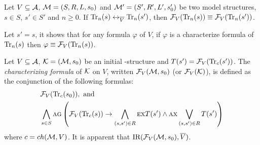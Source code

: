 \documentclass{article}
\begin{document}
\begin{lemma}\label{lem:Vb:TrFormula:Equ}
Let $V\subseteq {\cal A}$, ${\cal M}=(S, R, L, s_0)$ and ${\cal M}'=(S', R', L', s_0')$ be two model structures,
$s\in S$, $s'\in S'$ and $n\ge 0$. If $\textrm{Tr}_n(s) \leftrightarrow_{\overline V} \textrm{Tr}_n(s')$, then ${\cal F}_V(\textrm{Tr}_n(s)) \equiv {\cal F}_V(\textrm{Tr}_n(s'))$.
\end{lemma}
Let $s'=s$, it shows that for any formula $\varphi$ of $V$, if $\varphi$ is a characterize formula of $\textrm{Tr}_n(s)$ then $\varphi \equiv {\cal F}_V(\textrm{Tr}_n(s))$.



Let $V\subseteq\cal A$,
 ${\cal K}=({\cal M},s_0)$ be an initial \MPK-structure and $T(s') = {\cal F}_V(\textrm{Tr}_c(s'))$.
The {\em characterizing formula} of $\cal K$ on $V$, written ${\cal F}_V({\cal M},s_0)$ (or ${\cal F}_V({\cal K})$), is
defined as the conjunction of the following formulas:
\begin{align*}
  &{\cal F}_V(\textrm{Tr}_c(s_0)), \mbox{ and }\\
  & \bigwedge_{s\in S}\textsc{a} \textsc{g}\left(
    {\cal F}_V(\textrm{Tr}_c(s)) \rightarrow
    \bigwedge_{(s,s')\in R}
        \textsc{e} \textsc{x} T(s')
        \wedge
        \textsc{a} \textsc{x} \bigvee_{(s,s')\in R}T(s')
    \right)
\end{align*}
where $c=ch({\cal M},V)$. It is apparent that $\textrm{IR}({\cal F}_V({\cal M}, s_0), \overline V)$.
\end{document}
